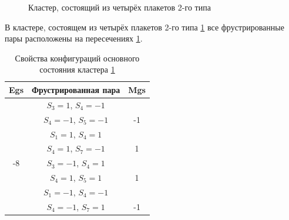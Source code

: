 \documentclass[utf8, babel, sor, jor, amsmath, amssymb, reprint]{elsarticle} %
\begin{document}
\begin{figure}[H]
	\centering
	\caption{Кластер, состоящий из четырёх плакетов 2-го типа}
	\label{fig:3x3}
\end{figure}

В кластере, состоящем из четырёх плакетов 2-го типа \ref{fig:3x3} все фрустрированные пары расположены на пересечениях \ref{tab:gs_3x3}.

\begin{table}[H]
	\centering
	\begin{tabular}{|c|c|c|}
		\hline
		Egs   &   Фрустрированная пара & Mgs\\
		\hline
		   &  $S_3=1$, $S_4=-1$&\\
		&    $S_4=-1$, $S_5=-1$ & -1\\
	\cline{2-3}
		   &  $S_1=1$, $S_4=1$&\\
		&    $S_4=1$, $S_7=-1$ & 1\\
			\cline{2-3}
		-8	\multirow{3}{*}{}
		  &  $S_3=-1$, $S_4=1$&\\
			&    $S_4=1$, $S_5=1$& 1\\
		\cline{2-3}
		   &  $S_1=-1$, $S_4=-1$&\\
			&    $S_4=-1$, $S_7=1$& -1\\
		\hline
	\end{tabular}
	\caption{Свойства конфигураций основного состояния кластера \ref{fig:3x3}}
	\label{tab:gs_3x3}
\end{table} 
\end{document}
